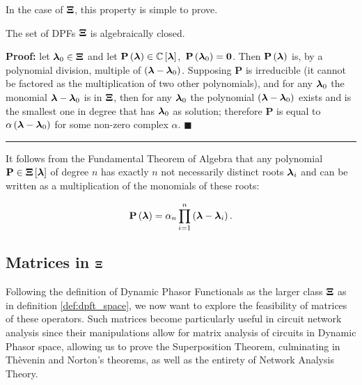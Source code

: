 	In the case of $\boldsymbol{\Xi}$, this property is simple to prove.

\begin{theorem}\label{theo:dps_alg_closed} %
	The set of DPFs $\boldsymbol{\Xi}$ is algebraically closed.
\end{theorem}
\textbf{Proof:} let $\boldsymbol{\lambda}_0\in\boldsymbol{\Xi}$ and let $\mathbf{P}\left(\boldsymbol{\lambda}\right)\in\mathbb{C}\left[\boldsymbol{\lambda}\right]$,\ $\mathbf{P}\left(\boldsymbol{\lambda}_0\right) = \mathbf{0}$. Then $\mathbf{P}\left(\boldsymbol{\lambda}\right)$ is, by a polynomial division, multiple of $\left(\boldsymbol{\lambda} - \boldsymbol{\lambda}_0\right)$. Supposing $\mathbf{P}$ is irreducible (it cannot be factored as the multiplication of two other polynomials), and for any $\boldsymbol{\lambda}_0$ the monomial $\boldsymbol{\lambda} - \boldsymbol{\lambda}_0$ is in $\boldsymbol{\Xi}$, then for any $\boldsymbol{\lambda}_0$ the polynomial $\left(\boldsymbol{\lambda} - \boldsymbol{\lambda}_0\right)$ exists and is the smallest one in degree that has $\boldsymbol{\lambda}_0$ as solution; therefore $\mathbf{P}$ is equal to $\alpha\left(\boldsymbol{\lambda} - \boldsymbol{\lambda}_0\right)$ for some non-zero complex $\alpha$. \hfill$\blacksquare$
\vspace{5mm}
\hrule
\vspace{5mm} %

	It follows from the Fundamental Theorem of Algebra that any polynomial $\mathbf{P}\in\boldsymbol{\Xi}\left[\boldsymbol{\lambda}\right]$ of degree $n$ has exactly $n$ not necessarily distinct roots $\boldsymbol{\lambda}_i$ and can be written as a multiplication of the monomials of these roots:

\begin{equation} \mathbf{P}\left(\boldsymbol{\lambda}\right) = \alpha_n \prod_{i=1}^n \left( \boldsymbol{\lambda} - \boldsymbol{\lambda}_i\right). \label{eq:fundamental_algebra_dpfs}\end{equation}

\subsection{Matrices in $\boldsymbol{\Xi}$}\label{subsec:matrces_in_dpfts} %

	Following the definition of Dynamic Phasor Functionals as the larger class $\boldsymbol{\Xi}$ as in definition \ref{def:dpft_space}, we now want to explore the feasibility of matrices of these operators. Such matrices become particularly useful in circuit network analysis since their manipulations allow for matrix analysis of circuits in Dynamic Phasor space, allowing us to prove the Superposition Theorem, culminating in Thèvenin and Norton's theorems, as well as the entirety of Network Analysis Theory.

